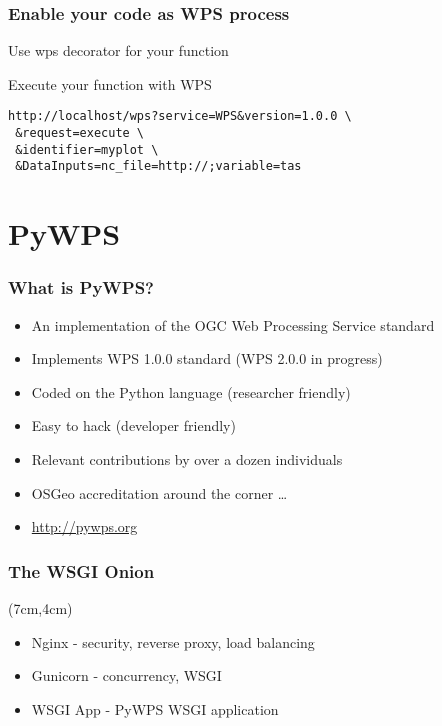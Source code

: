 \documentclass{beamer}
\begin{document}
\begin{frame}[fragile]
  \frametitle<presentation>{Enable your code as WPS process}
  \begin{block}{Use wps decorator for your function}
    \tiny
    \lstset{language=python}
    
  \end{block}
  \begin{block}{Execute your function with WPS}
    \begin{verbatim}
http://localhost/wps?service=WPS&version=1.0.0 \
 &request=execute \
 &identifier=myplot \
 &DataInputs=nc_file=http://;variable=tas
    \end{verbatim}
  \end{block}
\end{frame}

\section{PyWPS}

\begin{frame}
\frametitle{What is PyWPS?}

\begin{itemize}
  \item An implementation of the OGC Web Processing Service standard
  \item Implements WPS 1.0.0 standard (WPS 2.0.0 in progress)
  \item Coded on the Python language (researcher friendly)
  \item Easy to hack (developer friendly)
  \item Relevant contributions by over a dozen individuals
  \item OSGeo accreditation around the corner \ldots
  \item \url{http://pywps.org}

\end{itemize}
\end{frame}


\begin{frame}
\frametitle<presentation>{The WSGI Onion}


\begin{textblock*}{5cm}(7cm,4cm)
\begin{itemize}
  \item Nginx - security, reverse proxy, load balancing
  \item Gunicorn - concurrency, WSGI
  \item WSGI App - PyWPS WSGI application
\end{itemize}
\end{textblock*}
\end{frame}
\end{document}
